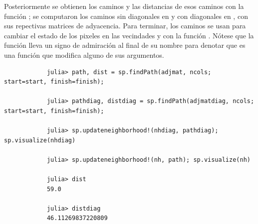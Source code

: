 \begin{enumerate}
\begin{solution}
        Posteriormente se obtienen los caminos y las distancias de esos caminos con la función ; se computaron los caminos sin diagonales en  y con diagonales en , con sus repectivas matrices de adyacencia. Para terminar, los caminos se usan para cambiar el estado de los pixeles en las vecindades  y  con la función . Nótese que la función lleva un signo de admiración \code{!} al final de su nombre para denotar que es una función que modifica alguno de sus argumentos.
        \begin{verbatim}
            julia> path, dist = sp.findPath(adjmat, ncols; start=start, finish=finish);

            julia> pathdiag, distdiag = sp.findPath(adjmatdiag, ncols; start=start, finish=finish);

            julia> sp.updateneighborhood!(nhdiag, pathdiag); sp.visualize(nhdiag)

            julia> sp.updateneighborhood!(nh, path); sp.visualize(nh)

            julia> dist
            59.0

            julia> distdiag
            46.11269837220809
        \end{verbatim}


\end{solution}
\end{enumerate}
